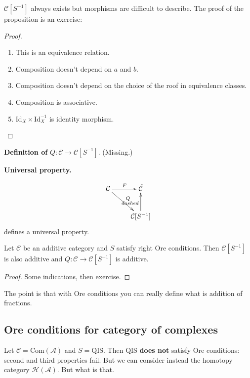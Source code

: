 $\mathcal{C}[S^{-1}]$ always exists but morphisms are difficult to describe. The
proof of the proposition is an exercise:

\begin{proof}
\begin{enumerate}
\item This is an equivalence relation.
\item Composition doesn't depend on $a$ and $b$.
\item Composition doesn't depend on the choice of the roof in equivalence
classes.
\item Composition is associative.
\item $\text{Id}_X \times \text{Id}_X^{-1}$ is identity morphism.
\end{enumerate}
\end{proof}

{\bf Definition of} $Q:\mathcal{C} \to \mathcal{C}[S^{-1}]$. (Missing.)

{\bf Universal property.}

$$
\xymatrix{
\mathcal{C}\ar[r]^{F}\ar[dr]^{Q}&  \tilde{\mathcal{C}}\\
&\mathcal{C}[S^{-1}]\ar[u]^{dashed}
}
$$
defines a universal property.

\begin{proposition}
\label{proposition-Ore-conditions}
Let $\mathcal{C}$ be an additive category and $S$ satisfy right Ore conditions.
Then $\mathcal{C}[S^{-1}]$ is also additive and $Q:\mathcal{C} \to
\mathcal{C}[S^{-1}]$ is additive.
\end{proposition}

\begin{proof}
Some indications, then exercise.
\end{proof}

The point is that with Ore conditions you can really define what is addition of
fractions.

\subsection*{Ore conditions for category of complexes}
\label{subsection-Ore-conditions-for-category-of-complexes}

Let $\mathcal{C}=\text{Com}(\mathcal{A})$ and $S=\text{QIS}$. Then QIS {\bf does
not} satisfy Ore conditions: second and third properties fail. But we can
consider instead the homotopy category $\mathcal{H}(\mathcal{A})$. But what is 
that.

